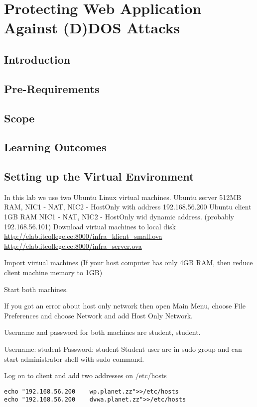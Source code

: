 

\chapter{Protecting Web Application Against (D)DOS Attacks}
\label{Protecting Web Application Against (D)DOS Attacks}
\section{Introduction}
\section{Pre-Requirements} 
\section{Scope}
\section{Learning Outcomes} 
\section{Setting up the Virtual Environment} 

In this lab we use two Ubuntu Linux virtual machines.
Ubuntu server 512MB RAM, NIC1 - NAT, NIC2 - HostOnly with address 192.168.56.200
Ubuntu client 1GB RAM NIC1 - NAT, NIC2 - HostOnly wid dynamic address. (probably 192.168.56.101)
Download virtual machines to local disk
\url{http://elab.itcollege.ee:8000/infra_klient_small.ova}
\url{http://elab.itcollege.ee:8000/infra_server.ova}

Import virtual machines (If your host computer has only 4GB RAM, then reduce client machine memory to 1GB)

Start both machines. 

{\small{If you got an error about host only network then open Main Menu, choose File Preferences and choose Network and add Host Only Network.}}

Username and password for both machines are student, student.

Username: student
Password: student
Student user are in sudo group and can start administrator shell with sudo command.

Log on to client and add two addresses on /etc/hosts
\begin{verbatim}
echo "192.168.56.200	wp.planet.zz">>/etc/hosts
echo "192.168.56.200	dvwa.planet.zz">>/etc/hosts
\end{verbatim}

